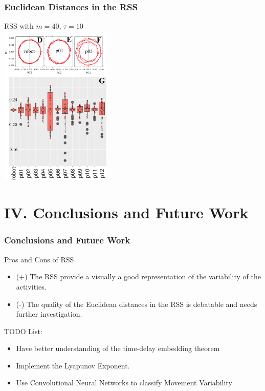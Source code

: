 \documentclass{beamer}
\begin{document}
\begin{frame}
\frametitle{Euclidean Distances in the RSS}

RSS with $m=40$, $\tau=10$ \\


 \centering
\includegraphics[width=0.4\textwidth]{Xochicale2017Fig1b}

\end{frame}




\section{IV. Conclusions and Future Work}









\begin{frame}
\frametitle{Conclusions and Future Work}
\vspace{-0.7cm}

Pros and Cons of RSS
    \begin{itemize}
    \item (+) The RSS provide a visually a good representation of the variability of the
    activities.
    \item (-) The quality of the Euclidean distances in the RSS
    is debatable and needs further investigation.
    \end{itemize}

TODO List:
\begin{itemize}
    \item Have better understanding of the time-delay embedding theorem
    \item Implement the Lyapunov Exponent.
    \item Use Convolutional Neural Networks to classify Movement Variability
    \end{itemize}

\end{frame}
\end{document}
